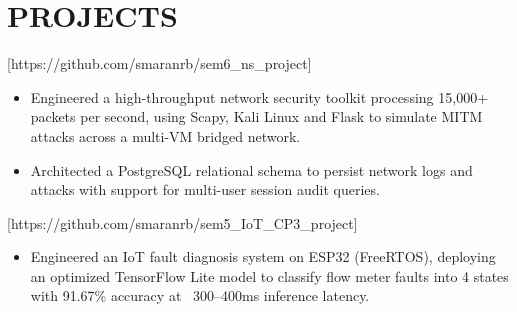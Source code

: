\section*{PROJECTS}

[https://github.com/smaranrb/sem6_ns_project]
\begin{itemize}
  \item Engineered a high-throughput network security toolkit processing 15,000+ packets per second, using Scapy, Kali Linux and Flask to simulate MITM attacks across a multi-VM bridged network.
  \item Architected a PostgreSQL relational schema to persist network logs and attacks with support for multi-user session audit queries.
\end{itemize}

[https://github.com/smaranrb/sem5_IoT_CP3_project]
\begin{itemize}
  \item Engineered an IoT fault diagnosis system on ESP32 (FreeRTOS), deploying an optimized TensorFlow Lite model to classify flow meter faults into 4 states with 91.67\% accuracy at ~300--400ms inference latency.
\end{itemize}


